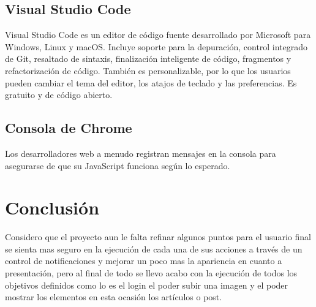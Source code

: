 \documentclass[60pt]{article}
\begin{document}
\subsection{Visual Studio Code}
Visual Studio Code es un editor de código fuente desarrollado por Microsoft para Windows, Linux y macOS. Incluye soporte para la depuración, control integrado de Git, resaltado de sintaxis, finalización inteligente de código, fragmentos y refactorización de código. También es personalizable, por lo que los usuarios pueden cambiar el tema del editor, los atajos de teclado y las preferencias. Es gratuito y de código abierto.
\subsection{Consola de Chrome}
Los desarrolladores web a menudo registran mensajes en la consola para asegurarse de que su JavaScript funciona según lo esperado.
\section{Conclusión}
Considero que el proyecto aun le falta refinar algunos puntos para el usuario final se sienta mas seguro en la ejecución de cada una de sus acciones a través de un control de notificaciones y mejorar un poco mas la apariencia en cuanto a presentación, pero al final de todo se llevo acabo con la ejecución de todos los objetivos definidos como lo es el login el poder subir una imagen y el poder mostrar los elementos en esta ocasión los artículos o post.
\end{document}
